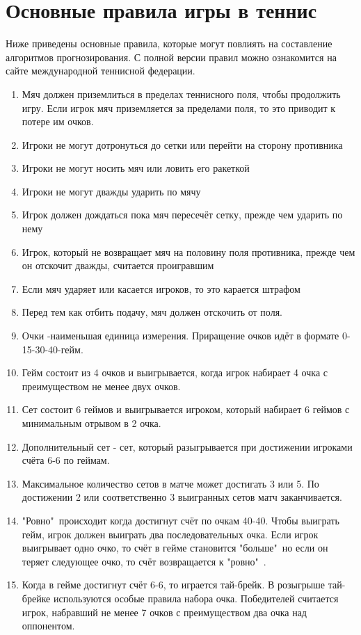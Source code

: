 \section{Основные правила игры в теннис}
Ниже приведены основные правила, которые могут повлиять на составление алгоритмов прогнозирования. С полной версии правил можно ознакомится на сайте международной теннисной федерации\cite{Book04}.
 \begin{enumerate}
	\item  Мяч должен приземлиться в пределах теннисного поля, чтобы продолжить игру. Если игрок мяч приземляется за пределами поля, то это приводит к потере им очков.
	\item Игроки не могут дотронуться до сетки или перейти на сторону противника
	\item Игроки не могут носить мяч или ловить его ракеткой
	\item Игроки не могут дважды ударить по мячу
    \item Игрок должен дождаться пока мяч пересечёт сетку, прежде чем ударить по нему
    \item Игрок, который не возвращает мяч на половину поля противника, прежде чем он отскочит дважды, считается проигравшим
    \item Если мяч ударяет или касается игроков, то это карается штрафом
    \item Перед тем как отбить подачу, мяч должен отскочить от поля.
    \item Очки -наименьшая единица измерения. Приращение очков идёт в формате 0-15-30-40-гейм.
    \item Гейм состоит из 4 очков и выигрывается, когда игрок набирает 4 очка с преимуществом не менее двух очков.
    \item Сет состоит 6 геймов и выигрывается игроком, который набирает 6 геймов 
 	 с минимальным отрывом в 2 очка.
 	 \item Дополнительный сет - сет, который разыгрывается при достижении игроками счёта 6-6 по геймам. 
  	\item Максимальное количество сетов в матче может достигать 3 или 5. По достижении 2 или соответственно 3 выигранных сетов матч заканчивается.
  	\item "Ровно"\ происходит когда достигнут счёт по очкам 40-40. Чтобы выиграть гейм, игрок должен выиграть два последовательных очка. Если игрок выигрывает одно очко, то счёт в гейме становится "больше"\, но если он теряет следующее очко, то счёт возвращается к "ровно"\ .
  	\item Когда в гейме достигнут счёт 6-6, то играется тай-брейк. В розыгрыше тай-брейке используются особые правила набора очка. Победителей считается игрок, набравший не менее 7 очков с преимуществом два очка над оппонентом.
\end{enumerate}
